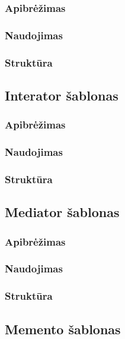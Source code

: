 \documentclass[10pt]{IEEEtran}
\begin{document}
			\subsubsection{Apibrėžimas}

			\subsubsection{Naudojimas}

			\subsubsection{Struktūra}

		\subsection{Interator šablonas}

			\subsubsection{Apibrėžimas}

			\subsubsection{Naudojimas}

			\subsubsection{Struktūra}

		\subsection{Mediator šablonas}

			\subsubsection{Apibrėžimas}

			\subsubsection{Naudojimas}

			\subsubsection{Struktūra}

		\subsection{Memento šablonas}
\end{document}
